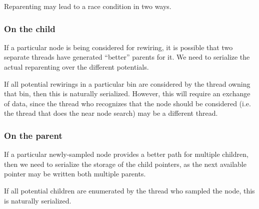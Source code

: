 Reparenting may lead to a race condition in two ways. 

\subsubsection{On the child}
If a particular node is being considered for rewiring, it is possible that two separate threads have generated ``better'' parents for it. We need to serialize the actual reparenting over the different potentials. 

If all potential rewirings in a particular bin are considered by the thread owning that bin, then this is naturally serialized. However, this will require an exchange of data, since the thread who recognizes that the node should be considered (i.e. the thread that does the near node search) may be a different thread.



\subsubsection{On the parent}
If a particular newly-sampled node provides a better path for multiple children, then we need to serialize the storage of the child pointers, as the next available pointer may be written both multiple parents. 

If all potential children are enumerated by the thread who sampled the node, this is naturally serialized.










 